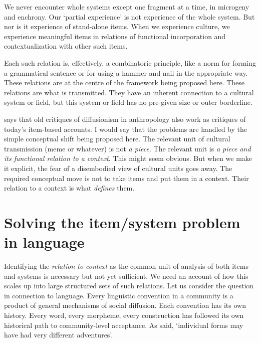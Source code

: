 We never encounter whole systems except one fragment at a time, in microgeny and enchrony. Our 
\textquoteleft partial experience' \citep[191]{le_page_acts_1985} is not 
experience of the whole system. But nor is it experience of stand-alone 
items. When we experience culture, we experience meaningful items in 
relations of functional incorporation and contextualization with other 
such items. 


Each such relation is, effectively, a combinatoric principle, like a 
norm for forming a grammatical sentence or for using a hammer and nail 
in the appropriate way. These relations are at the centre of the 
framework being proposed here. These relations are what is transmitted. 
They have an inherent connection to a cultural system or field, 
but this system or field has no pre-given size or outer borderline.



\citet{bloch_well-disposed_2000} says that old critiques of diffusionism in anthropology 
also work as critiques of today's item-based accounts. I would say that 
the problems are handled by the simple conceptual shift 
being proposed here. The relevant unit of cultural transmission (meme or 
whatever) is not \textit{a piece}. The relevant unit is \textit{a piece and its 
functional relation to a context}. This might seem obvious. But when we 
make it explicit, the fear of a disembodied view of cultural units goes 
away. The required conceptual move is not to take 
items and put them in a context. Their relation to a context is what \textit{defines} them. 



\section{Solving the item/system problem in language}


Identifying the \textit{relation to context} as the common unit of 
analysis of both items and systems is necessary but not yet sufficient. We 
need an account of how this scales up into large structured sets of such 
relations. Let us consider the question in connection to language. Every linguistic convention in a community is a 
product of general mechanisms of social diffusion. Each convention has its own history. Every word, 
every morpheme, every construction has followed its own historical path to 
community-level acceptance. As \citet[444]{bloomfield_language_1933} said, \textquoteleft individual forms may have had very 
different adventures'. 



